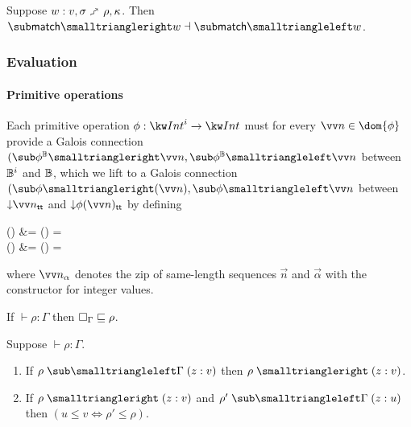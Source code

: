 \begin{theorem}
\label{thm:core-language:match:gc}
   Suppose $w: v, \sigma \matchFwdS \rho, \kappa$.  Then $\matchFwdF{w} \adjoint \matchBwdF{w}$.
\end{theorem}

\subsubsection{Evaluation}

\paragraph{Primitive operations}

Each primitive operation $\phi: \tyInt^{i} \to \tyInt$ must for every $\vec{n} \in \dom{\phi}$ provide a Galois connection $(\primFwdBool{\phi}{\vec{n}}, \primBwdBool{\phi}{\vec{n}}$ between $\mathbb{B}^i$ and $\mathbb{B}$, which we lift to a Galois connection $(\primFwd{\phi}(\vec{n}), \primBwd{\phi}{\vec{n}}$ between $\Below{\vec{\annInt{n}{\TT}}}$ and $\Below{\annInt{\phi(\vec{n})}{\TT}}$ by defining
\begin{definition}
\label{def:core-language:primop-gc}
\begin{salign}
   () &= 
   (\vec{\alpha}) = \beta
   \\
   () &= 
   (\beta) = \vec{\alpha}
\end{salign}
\end{definition}

\noindent where $\vec{\annInt{n}{\alpha}}$ denotes the zip of same-length sequences $\vec{n}$ and $\vec{\alpha}$ with the constructor for integer values.






\begin{lemma}
\label{lem:core-language:hole-env}If $\vdash \rho: \Gamma$ then $\square_{\Gamma} \sqsubseteq \rho$.
\end{lemma}

\begin{lemma}
\label{lem:core-language:env-get-put}Suppose $\vdash \rho: \Gamma$.
\begin{enumerate}
   \item \label{lem:core-language:env-get-put:1} If $\envLookupBwd{\rho}{\Gamma}{\bind{z}{v}}$ then $\envLookup{\rho}{z}{v}$.
   \item \label{lem:core-language:env-get-put:2} If $\envLookup{\rho}{z}{v}$ and $\envLookupBwd{\rho'}{\Gamma}{\bind{z}{u}}$ then $(u \leq v \iff \rho' \leq \rho)$.
\end{enumerate}
\end{lemma}

